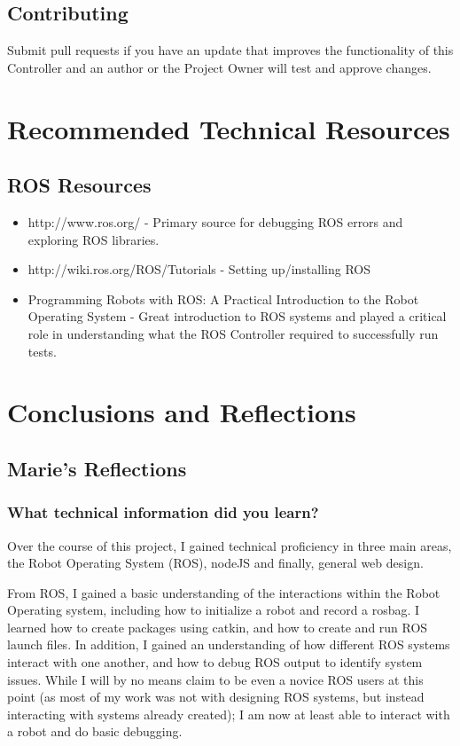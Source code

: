 \documentclass[onecolumn, draftclsnofoot,10pt, compsoc]{report}
\begin{document}
\section{Contributing}

Submit pull requests if you have an update that improves the functionality of this Controller and an author or the Project Owner will test and approve changes.

\chapter{Recommended Technical Resources}
\minitoc
\section{ROS Resources}
\begin{itemize}
	\item http://www.ros.org/ - Primary source for debugging ROS errors and exploring ROS libraries.
	\item http://wiki.ros.org/ROS/Tutorials - Setting up/installing ROS
	\item Programming Robots with ROS: A Practical Introduction to the Robot Operating System - Great introduction to ROS systems and played a critical role in understanding what the ROS Controller required to successfully run tests.
\end{itemize}

\chapter{Conclusions and Reflections}
\minitoc
\section{Marie's Reflections}
\subsection{What technical information did you learn?}
Over the course of this project, I gained technical proficiency in three main areas, the Robot Operating System (ROS), nodeJS and finally, general web design. 

From ROS, I gained a basic understanding of the interactions within the Robot Operating system, including how to initialize a robot and record a rosbag. I learned how to create packages using catkin, and how to create and run ROS launch files. In addition, I gained an understanding of how different ROS systems interact with one another, and how to debug ROS output to identify system issues. While I will by no means claim to be even a novice ROS users at this point (as most of my work was not with designing ROS systems, but instead interacting with systems already created); I am now at least able to interact with a robot and do basic debugging. 
\end{document}
